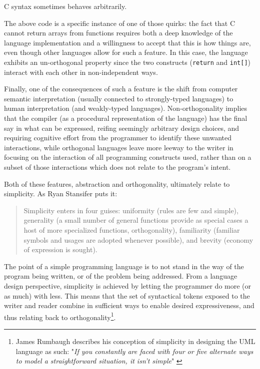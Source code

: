 \begin{listing}
  \inputminted{go}{./corpus/illegal_return.c}
  \caption{C syntax sometimes behaves arbitrarily.}
  \label{code:illegal-return}
\end{listing}

The above code is a specific instance of one of those quirks: the fact that C cannot return arrays from functions requires both a deep knowledge of the language implementation and a willingness to accept that this is how things are, even though other languages allow for such a feature. In this case, the language exhibits an un-orthogonal property since the two constructs (\lstinline{return} and \lstinline{int[]}) interact with each other in non-independent ways.

Finally, one of the consequences of such a feature is the shift from computer semantic interpretation (usually connected to strongly-typed languages) to human interpretation (and weakly-typed languages). Non-orthogonality implies that the compiler (as a procedural representation of the language) has the final say in what can be expressed, reifing seemingly arbitrary design choices, and requiring cognitive effort from the programmer to identify these unwanted interactions, while orthogonal languages leave more leeway to the writer in focusing on the interaction of all programming constructs used, rather than on a subset of those interactions which does not relate to the program's intent.

Both of these features, abstraction and orthogonality, ultimately relate to simplicity. As Ryan Stansifer puts it:

\begin{quote}
  Simplicity enters in four guises: uniformity (rules are few and simple), generality (a small number of general functions provide as special cases a host of more specialized functions, orthogonality), familiarity (familiar symbols and usages are adopted whenever possible), and brevity (economy of expression is sought). \citep{stansifer_study_1994}
\end{quote}

The point of a simple programming language is to not stand in the way of the program being written, or of the problem being addressed. From a language design perspective, simplicity is achieved by letting the programmer do more (or as much) with less. This means that the set of syntactical tokens exposed to the writer and reader combine in sufficient ways to enable desired expressiveness, and thus relating back to orthogonality\footnote{James Rumbaugh describes his conception of simplicity in designing the UML language as such: "\emph{If you constantly are faced with four or five alternate ways to model a straightforward situation, it isn't simple}" \citep{biancuzzi_masterminds_2009}}.

